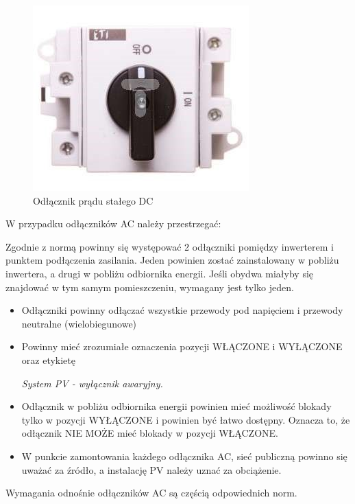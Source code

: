 \documentclass[12pt,a4paper]{article}
\begin{document}
\begin{figure}[H]
\centering
\caption{Odłącznik prądu stałego DC}
\includegraphics[natwidth=7.57cm,natheight=6.48cm]{media/image23.jpg}
\end{figure} 

W przypadku odłączników AC należy przestrzegać: 

Zgodnie z normą powinny się występować 2 odłączniki pomiędzy 
inwerterem i punktem podłączenia zasilania. Jeden powinien zostać 
zainstalowany w pobliżu inwertera, a drugi w pobliżu odbiornika energii. Jeśli obydwa miałyby się znajdować w tym samym pomieszczeniu, wymagany jest tylko jeden. 

\begin{itemize}
\item Odłączniki powinny odłączać wszystkie przewody pod napięciem i 
przewody neutralne (wielobiegunowe) 
\item Powinny mieć zrozumiałe oznaczenia pozycji WŁĄCZONE i WYŁĄCZONE 
oraz etykietę 
\begin{displayquote}
\textit{System PV - wyłącznik awaryjny. }
\end{displayquote}
\item Odłącznik w pobliżu odbiornika energii powinien mieć możliwość 
blokady tylko w pozycji WYŁĄCZONE i powinien być łatwo dostępny. Oznacza 
to, że odłącznik NIE MOŻE mieć blokady w pozycji WŁĄCZONE. 
\item W punkcie zamontowania każdego odłącznika AC, sieć publiczną 
powinno się uważać za źródło, a instalację PV należy uznać za obciążenie. 
\end{itemize}


Wymagania odnośnie odłączników AC są częścią odpowiednich 
norm.
\end{document}
